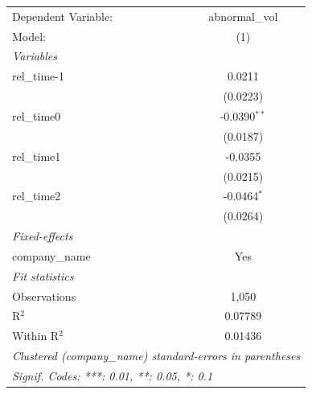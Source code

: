 
\begingroup
\centering
\begin{tabular}{lc}
   \tabularnewline \midrule \midrule
   Dependent Variable: & abnormal\_vol\\   
   Model:              & (1)\\  
   \midrule
   \emph{Variables}\\
   rel\_time-1         & 0.0211\\   
                       & (0.0223)\\   
   rel\_time0          & -0.0390$^{**}$\\   
                       & (0.0187)\\   
   rel\_time1          & -0.0355\\   
                       & (0.0215)\\   
   rel\_time2          & -0.0464$^{*}$\\   
                       & (0.0264)\\   
   \midrule
   \emph{Fixed-effects}\\
   company\_name       & Yes\\  
   \midrule
   \emph{Fit statistics}\\
   Observations        & 1,050\\  
   R$^2$               & 0.07789\\  
   Within R$^2$        & 0.01436\\  
   \midrule \midrule
   \multicolumn{2}{l}{\emph{Clustered (company\_name) standard-errors in parentheses}}\\
   \multicolumn{2}{l}{\emph{Signif. Codes: ***: 0.01, **: 0.05, *: 0.1}}\\
\end{tabular}
\par\endgroup


